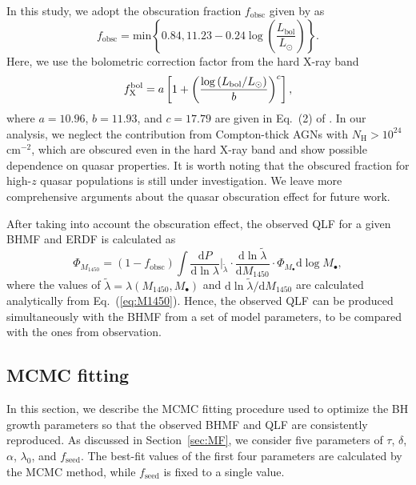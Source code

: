 \documentclass[twocolumn, twocolappendix]{aastex63}
\newcommand{\Mbh}{M_\bullet}
\newcommand{\tlife}{\tau}
\newcommand{\fseed}{f_\mathrm{seed}}
\newcommand{\fobsc}{f_\mathrm{obsc}}
\newcommand{\Muv}{M_{1450}}
\newcommand{\Lbol}{L_\mathrm{bol}}
\newcommand{\D}{\mathrm{d}}
\begin{document}
\begin{CJK*}{UTF8}{gbsn}
In this study, we adopt the obscuration fraction $\fobsc$ given by \cite{2014ApJ...786..104U} as
%
\begin{equation}
\fobsc = \text{min}\left\{0.84 , 11.23-0.24 \log \left(\frac{\Lbol}{L_\odot}\right) \right \}.
\end{equation}
%
Here, we use the bolometric correction factor from the hard X-ray band 
%
\begin{equation}
  f^{\rm bol}_{\rm X} =
  a\left[1+\left(\frac{\log \left(\Lbol / L_\odot\right)}{b}\right)^{c}\right],
\end{equation}
%
where $a=10.96$, $b = 11.93$, and $c = 17.79$ are given in Eq.~(2) of \citet{2020A&A...636A..73D}. 
In our analysis, we neglect the contribution from Compton-thick AGNs with $N_\mathrm{H}>10^{24}$ cm$^{-2}$, 
which are obscured even in the hard X-ray band and show possible dependence on quasar properties.
It is worth noting that the obscured fraction for high-$z$ quasar populations is still under investigation.
We leave more comprehensive arguments about the quasar obscuration effect for future work.


After taking into account the obscuration effect, 
the observed QLF for a given BHMF and ERDF is calculated as
%
\begin{equation}
\label{eq:dn_dM1450}
\Phi_{\Muv} 
 = (1 -\fobsc)  %
\int \frac{\D P}{\D \ln \lambda}\Big|_{\tilde{\lambda}}  \cdot
\frac{\D \ln \tilde{\lambda}}{\D \Muv} \cdot
 \Phi_{\Mbh} \D \log \Mbh,
\end{equation}
%
where the values of $\tilde{\lambda}=\lambda(\Muv, \Mbh)$ and $\D \ln \tilde{\lambda}/\D \Muv$ are calculated analytically from Eq.~(\ref{eq:M1450}).
%
Hence, the observed QLF can be produced simultaneously with the BHMF from a set of model parameters, 
to be compared with the ones from observation.




\vspace{2mm}
\subsection{MCMC fitting}\label{sec:fitting}



In this section, we describe the MCMC fitting procedure used to optimize 
the BH growth parameters so that the observed BHMF and QLF are consistently reproduced. 
As discussed in Section~\ref{sec:MF}, we consider five parameters of $\tlife$, $\delta$, $\alpha$, $\lambda_0$, and $\fseed$.
The best-fit values of the first four parameters are calculated by the MCMC method, while $\fseed$ is fixed to a single value.


\end{CJK*}
\end{document}
